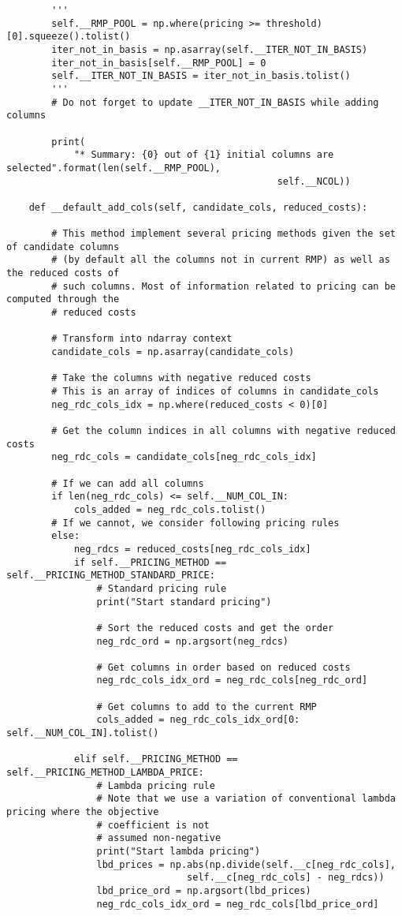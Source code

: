 \documentclass{article}
\begin{document}
\begin{lstlisting}
        '''
        self.__RMP_POOL = np.where(pricing >= threshold)[0].squeeze().tolist()
        iter_not_in_basis = np.asarray(self.__ITER_NOT_IN_BASIS)
        iter_not_in_basis[self.__RMP_POOL] = 0
        self.__ITER_NOT_IN_BASIS = iter_not_in_basis.tolist()
        '''
        # Do not forget to update __ITER_NOT_IN_BASIS while adding columns

        print(
            "* Summary: {0} out of {1} initial columns are selected".format(len(self.__RMP_POOL), 
            								    self.__NCOL))

    def __default_add_cols(self, candidate_cols, reduced_costs):

        # This method implement several pricing methods given the set of candidate columns
        # (by default all the columns not in current RMP) as well as the reduced costs of
        # such columns. Most of information related to pricing can be computed through the
        # reduced costs

        # Transform into ndarray context
        candidate_cols = np.asarray(candidate_cols)

        # Take the columns with negative reduced costs
        # This is an array of indices of columns in candidate_cols
        neg_rdc_cols_idx = np.where(reduced_costs < 0)[0]

        # Get the column indices in all columns with negative reduced costs
        neg_rdc_cols = candidate_cols[neg_rdc_cols_idx]

        # If we can add all columns
        if len(neg_rdc_cols) <= self.__NUM_COL_IN:
            cols_added = neg_rdc_cols.tolist()
        # If we cannot, we consider following pricing rules
        else:
            neg_rdcs = reduced_costs[neg_rdc_cols_idx]
            if self.__PRICING_METHOD == self.__PRICING_METHOD_STANDARD_PRICE:
                # Standard pricing rule
                print("Start standard pricing")

                # Sort the reduced costs and get the order
                neg_rdc_ord = np.argsort(neg_rdcs)

                # Get columns in order based on reduced costs
                neg_rdc_cols_idx_ord = neg_rdc_cols[neg_rdc_ord]

                # Get columns to add to the current RMP
                cols_added = neg_rdc_cols_idx_ord[0: self.__NUM_COL_IN].tolist()

            elif self.__PRICING_METHOD == self.__PRICING_METHOD_LAMBDA_PRICE:
                # Lambda pricing rule
                # Note that we use a variation of conventional lambda pricing where the objective 
                # coefficient is not
                # assumed non-negative
                print("Start lambda pricing")
                lbd_prices = np.abs(np.divide(self.__c[neg_rdc_cols], 
                				self.__c[neg_rdc_cols] - neg_rdcs))
                lbd_price_ord = np.argsort(lbd_prices)
                neg_rdc_cols_idx_ord = neg_rdc_cols[lbd_price_ord]


\end{lstlisting}
\end{document}
